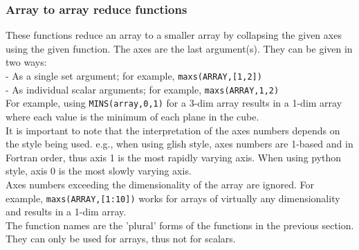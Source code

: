 \subsubsection{Array to array reduce functions}
These functions reduce an array to a smaller array by collapsing
the given axes using the given function. The axes are the last argument(s).
They can be given in two ways:
\\- As a single set argument; for example, \texttt{maxs(ARRAY,[1,2])}
\\- As individual scalar arguments; for example, \texttt{maxs(ARRAY,1,2)}
\\For example, using
\texttt{MINS(array,0,1)} for a 3-dim array results in a 1-dim array
where each value is the minimum of each plane in the cube.
\\It is important to note that the interpretation of the axes numbers
depends on the style being used. e.g., when using glish style, axes numbers are
1-based and in Fortran order, thus axis 1 is the most rapidly varying
axis. When using python style, axis 0 is the most slowly varying axis.
\\Axes numbers exceeding the dimensionality of the array are ignored.
For example, \texttt{maxs(ARRAY,[1:10])} works for arrays
of virtually any dimensionality and results in a 1-dim array.
\\The function names are the 'plural' forms of the
functions in the previous section.
They can only be used for arrays, thus not for scalars.

